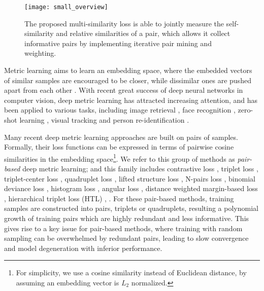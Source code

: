 \documentclass[10pt,twocolumn,letterpaper]{article}
\begin{document}
\begin{figure}[t]
	\vspace{10pt}
	\centering
	\texttt{[image: small\_overview]}
	\caption{\small The proposed multi-similarity loss is able to jointly measure the self-similarity and relative similarities of a pair, which allows it collect informative pairs by implementing iterative pair mining and weighting.}
	\label{overview}
	\vspace{-10pt}
\end{figure}
Metric learning aims to learn an embedding space, where the embedded vectors of similar samples are encouraged to be closer, while dissimilar ones are pushed apart from each other \cite{lowe1995similarity,mika1999fisher,xing2003distance}.
With recent great success of deep neural networks in computer vision, deep metric learning has attracted increasing attention,
and has been applied to various tasks, including image retrieval \cite{wohlhart2015learning,He_2018_CVPR,Grabner_2018_CVPR}, face recognition \cite{Wen2016},
zero-shot learning \cite{zhang2016zero,bucher2016improving,Yelamarthi_2018_ECCV}, visual tracking \cite{leal2016learning,tao2016siamese} and person re-identification \cite{Yu_2018_ECCV,in-defense}.

Many recent deep metric learning approaches are built on pairs of samples. Formally, their loss functions can be expressed in terms of pairwise cosine similarities in the embedding space{\footnote {For simplicity, we use a cosine similarity instead of Euclidean distance, by assuming an embedding vector is $L_2 $ normalized.}}. We refer to this group of methods as {\it pair-based} deep metric learning; and this family includes contrastive loss \cite{contrastive}, triplet loss \cite{Hoffer2015DeepML}, triplet-center loss \cite{He_2018_CVPR}, quadruplet loss \cite{quadruplet}, lifted structure loss \cite{lifted-structured-loss}, N-pairs loss \cite{n-pairs}, binomial deviance loss \cite{binomial}, histogram loss \cite{histogram}, angular loss \cite{angular}, distance weighted margin-based loss \cite{sampling}, hierarchical triplet loss (HTL) \cite{HTL}, \etc.
For these pair-based methods, training samples are constructed into pairs, triplets or quadruplets, resulting a polynomial growth of training pairs which are highly redundant and less informative.
This gives rise to a key issue for pair-based methods, where training with random sampling can be overwhelmed by redundant pairs, leading to slow convergence and model degeneration with inferior performance.
\end{document}
